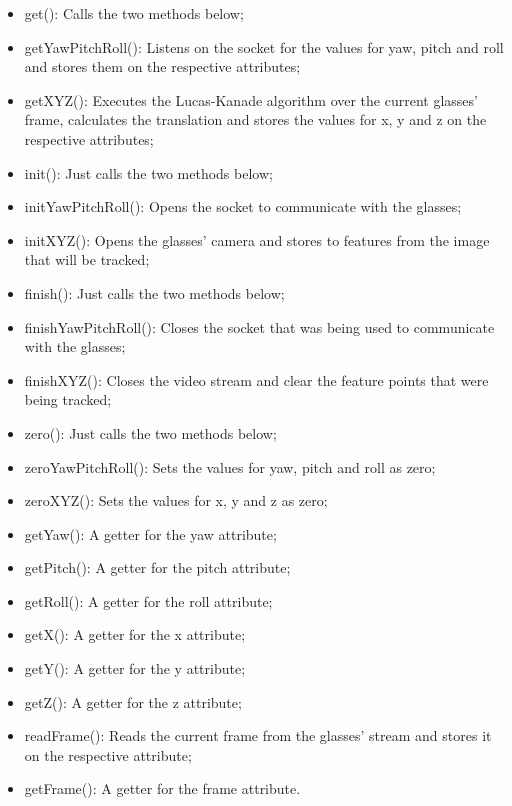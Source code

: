 \documentclass[msc, a4paper, classic, en]{ufbathesis}
\begin{document}
\begin{itemize}
  \item get(): Calls the two methods below;
  \item getYawPitchRoll(): Listens on the socket for the values for yaw, pitch and roll and stores them on the respective attributes;
  \item getXYZ(): Executes the Lucas-Kanade algorithm over the current glasses' frame, calculates the translation and stores the values for x, y and z on the respective attributes;
  \item init(): Just calls the two methods below;
  \item initYawPitchRoll(): Opens the socket to communicate with the glasses;
  \item initXYZ(): Opens the glasses' camera and stores to features from the image that will be tracked;
  \item finish(): Just calls the two methods below;
  \item finishYawPitchRoll(): Closes the socket that was being used to communicate with the glasses;
  \item finishXYZ(): Closes the video stream and clear the feature points that were being tracked;
  \item zero(): Just calls the two methods below;
  \item zeroYawPitchRoll(): Sets the values for yaw, pitch and roll as zero;
  \item zeroXYZ(): Sets the values for x, y and z as zero;
  \item getYaw(): A getter for the yaw attribute;
  \item getPitch(): A getter for the pitch attribute;
  \item getRoll(): A getter for the roll attribute;
  \item getX(): A getter for the x attribute;
  \item getY(): A getter for the y attribute;
  \item getZ(): A getter for the z attribute;
  \item readFrame(): Reads the current frame from the glasses' stream and stores it on the respective attribute;
  \item getFrame(): A getter for the frame attribute.
\end{itemize}
\end{document}
